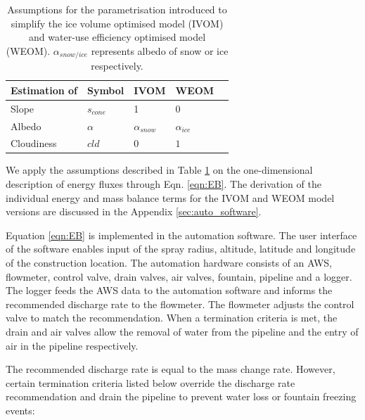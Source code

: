 \begin{table}[htb]
	\centering
	\caption{Assumptions for the parametrisation introduced to simplify the ice volume optimised model (IVOM) and
		water-use efficiency optimised model (WEOM). $\alpha_{snow/ice}$ represents albedo of snow or ice respectively.}
	\label{tab:assumptions}
	\begin{tabular}{|lllll|}
		\toprule
		\textbf{Estimation of}          & \textbf{Symbol} & \textbf{IVOM}   & \textbf{WEOM}  &                       \\\midrule
		\multicolumn{1}{|l}{Slope}      & $s_{cone}$      & 1               & 0              & \multicolumn{1}{l|}{} \\
		\multicolumn{1}{|l}{Albedo}     & $\alpha$        & $\alpha_{snow}$ & $\alpha_{ice}$ & \multicolumn{1}{l|}{} \\
		\multicolumn{1}{|l}{Cloudiness} & $cld$           & $0$             & $1$            & \multicolumn{1}{l|}{} \\\bottomrule
	\end{tabular}
\end{table}

We apply the assumptions described in Table \ref{tab:assumptions} on the one-dimensional description of energy
fluxes through Eqn. \ref{eqn:EB}. The derivation of the individual energy and mass balance terms for the
\ac{IVOM} and \ac{WEOM} model versions are discussed in the Appendix \ref{sec:auto_software}.

Equation \ref{eqn:EB} is implemented in the automation software. The user interface of the software enables
input of the spray radius, altitude, latitude and longitude of the construction location. The automation
hardware consists of an AWS, flowmeter, control valve, drain valves, air valves, fountain, pipeline and a
logger. The logger feeds the AWS data to the automation software and informs the recommended discharge rate to
the flowmeter. The flowmeter adjusts the control valve to match the recommendation. When a termination
criteria is met, the drain and air valves allow the removal of water from the pipeline and the entry of
air in the pipeline respectively.

The recommended discharge rate is equal to the mass change rate. However, certain termination criteria listed
below override the discharge rate recommendation and drain the pipeline to prevent water loss or fountain
freezing events:

